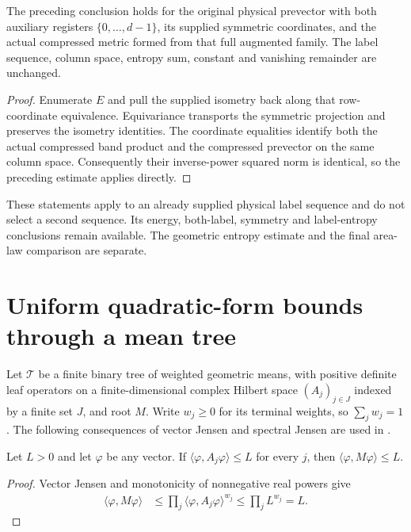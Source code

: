 \begin{theorem}
    \label{thm:supplied_replica_prevector_sharp_rate}
    \leanok
    The preceding conclusion holds for the original physical prevector with
    both auxiliary registers $\{0,\ldots,d-1\}$, its supplied symmetric
    coordinates, and the actual compressed metric formed from that full
    augmented family. The label sequence, column space, entropy sum,
    constant and vanishing remainder are unchanged.
\end{theorem}
\begin{proof}
    \leanok
    Enumerate $E$ and pull the supplied isometry back along that row-coordinate
    equivalence. Equivariance transports the symmetric projection and
    preserves the isometry identities. The coordinate equalities
    identify both the actual compressed band product and the compressed
    prevector on the same column space. Consequently their inverse-power
    squared norm is identical, so the preceding estimate applies directly.
\end{proof}

These statements apply to an already supplied physical label sequence and do
not select a second sequence. Its energy, both-label, symmetry and label-entropy
conclusions remain available. The geometric entropy estimate and the final
area-law comparison are separate.

\section{Uniform quadratic-form bounds through a mean tree}
\label{sec:mean_tree_uniform_expectation}

Let $\mathcal T$ be a finite binary tree of weighted geometric means, with
positive definite leaf operators on a finite-dimensional complex Hilbert space $(A_j)_{j\in J}$ indexed by a finite set $J$,
and root $M$.
Write $w_j\ge0$ for its terminal weights, so $\sum_jw_j=1$.
The following consequences of vector Jensen and spectral Jensen are used
in \cite[Section~8, upper comparisons]{OpenAI2026AreaLaw}.

\begin{theorem}
    \label{thm:mean_tree_uniform_expectation}
    \leanok

    Let $L>0$ and let $\varphi$ be any vector. If
    $\langle\varphi,A_j\varphi\rangle\le L$ for every $j$, then
    $\langle\varphi,M\varphi\rangle\le L$.
\end{theorem}
\begin{proof}
    \leanok
    Vector Jensen and monotonicity of nonnegative real powers give
    \begin{align*}
        \langle\varphi,M\varphi\rangle
        &\le\prod_j\langle\varphi,A_j\varphi\rangle^{w_j}
        \le\prod_j L^{w_j}=L.
    \end{align*}
\end{proof}

